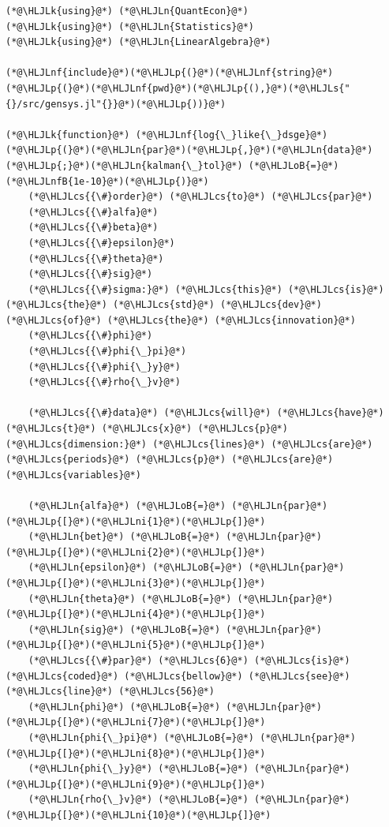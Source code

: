 \documentclass[12pt,a4paper]{article}
\newcommand{\HLJLk}[1]{\textcolor[RGB]{148,91,176}{\textbf{#1}}}
\newcommand{\HLJLn}[1]{#1}
\newcommand{\HLJLnf}[1]{\textcolor[RGB]{66,102,213}{#1}}
\newcommand{\HLJLs}[1]{\textcolor[RGB]{201,61,57}{#1}}
\newcommand{\HLJLnfB}[1]{\textcolor[RGB]{59,151,46}{#1}}
\newcommand{\HLJLni}[1]{\textcolor[RGB]{59,151,46}{#1}}
\newcommand{\HLJLoB}[1]{\textcolor[RGB]{102,102,102}{\textbf{#1}}}
\newcommand{\HLJLp}[1]{#1}
\newcommand{\HLJLcs}[1]{\textcolor[RGB]{153,153,119}{\textit{#1}}}
\begin{document}
\begin{lstlisting}
(*@\HLJLk{using}@*) (*@\HLJLn{QuantEcon}@*)
(*@\HLJLk{using}@*) (*@\HLJLn{Statistics}@*)
(*@\HLJLk{using}@*) (*@\HLJLn{LinearAlgebra}@*)

(*@\HLJLnf{include}@*)(*@\HLJLp{(}@*)(*@\HLJLnf{string}@*)(*@\HLJLp{(}@*)(*@\HLJLnf{pwd}@*)(*@\HLJLp{(),}@*)(*@\HLJLs{"{}/src/gensys.jl"{}}@*)(*@\HLJLp{))}@*)

(*@\HLJLk{function}@*) (*@\HLJLnf{log{\_}like{\_}dsge}@*)(*@\HLJLp{(}@*)(*@\HLJLn{par}@*)(*@\HLJLp{,}@*)(*@\HLJLn{data}@*)(*@\HLJLp{;}@*)(*@\HLJLn{kalman{\_}tol}@*) (*@\HLJLoB{=}@*) (*@\HLJLnfB{1e-10}@*)(*@\HLJLp{)}@*)
    (*@\HLJLcs{{\#}order}@*) (*@\HLJLcs{to}@*) (*@\HLJLcs{par}@*)
    (*@\HLJLcs{{\#}alfa}@*)
    (*@\HLJLcs{{\#}beta}@*)
    (*@\HLJLcs{{\#}epsilon}@*)
    (*@\HLJLcs{{\#}theta}@*)
    (*@\HLJLcs{{\#}sig}@*)
    (*@\HLJLcs{{\#}sigma:}@*) (*@\HLJLcs{this}@*) (*@\HLJLcs{is}@*) (*@\HLJLcs{the}@*) (*@\HLJLcs{std}@*) (*@\HLJLcs{dev}@*) (*@\HLJLcs{of}@*) (*@\HLJLcs{the}@*) (*@\HLJLcs{innovation}@*)
    (*@\HLJLcs{{\#}phi}@*)
    (*@\HLJLcs{{\#}phi{\_}pi}@*)
    (*@\HLJLcs{{\#}phi{\_}y}@*)
    (*@\HLJLcs{{\#}rho{\_}v}@*)

    (*@\HLJLcs{{\#}data}@*) (*@\HLJLcs{will}@*) (*@\HLJLcs{have}@*) (*@\HLJLcs{t}@*) (*@\HLJLcs{x}@*) (*@\HLJLcs{p}@*) (*@\HLJLcs{dimension:}@*) (*@\HLJLcs{lines}@*) (*@\HLJLcs{are}@*) (*@\HLJLcs{periods}@*) (*@\HLJLcs{p}@*) (*@\HLJLcs{are}@*) (*@\HLJLcs{variables}@*)

    (*@\HLJLn{alfa}@*) (*@\HLJLoB{=}@*) (*@\HLJLn{par}@*)(*@\HLJLp{[}@*)(*@\HLJLni{1}@*)(*@\HLJLp{]}@*)
    (*@\HLJLn{bet}@*) (*@\HLJLoB{=}@*) (*@\HLJLn{par}@*)(*@\HLJLp{[}@*)(*@\HLJLni{2}@*)(*@\HLJLp{]}@*)
    (*@\HLJLn{epsilon}@*) (*@\HLJLoB{=}@*) (*@\HLJLn{par}@*)(*@\HLJLp{[}@*)(*@\HLJLni{3}@*)(*@\HLJLp{]}@*)
    (*@\HLJLn{theta}@*) (*@\HLJLoB{=}@*) (*@\HLJLn{par}@*)(*@\HLJLp{[}@*)(*@\HLJLni{4}@*)(*@\HLJLp{]}@*)
    (*@\HLJLn{sig}@*) (*@\HLJLoB{=}@*) (*@\HLJLn{par}@*)(*@\HLJLp{[}@*)(*@\HLJLni{5}@*)(*@\HLJLp{]}@*)
    (*@\HLJLcs{{\#}par}@*) (*@\HLJLcs{6}@*) (*@\HLJLcs{is}@*) (*@\HLJLcs{coded}@*) (*@\HLJLcs{bellow}@*) (*@\HLJLcs{see}@*) (*@\HLJLcs{line}@*) (*@\HLJLcs{56}@*)
    (*@\HLJLn{phi}@*) (*@\HLJLoB{=}@*) (*@\HLJLn{par}@*)(*@\HLJLp{[}@*)(*@\HLJLni{7}@*)(*@\HLJLp{]}@*)
    (*@\HLJLn{phi{\_}pi}@*) (*@\HLJLoB{=}@*) (*@\HLJLn{par}@*)(*@\HLJLp{[}@*)(*@\HLJLni{8}@*)(*@\HLJLp{]}@*)
    (*@\HLJLn{phi{\_}y}@*) (*@\HLJLoB{=}@*) (*@\HLJLn{par}@*)(*@\HLJLp{[}@*)(*@\HLJLni{9}@*)(*@\HLJLp{]}@*)
    (*@\HLJLn{rho{\_}v}@*) (*@\HLJLoB{=}@*) (*@\HLJLn{par}@*)(*@\HLJLp{[}@*)(*@\HLJLni{10}@*)(*@\HLJLp{]}@*)


\end{lstlisting}
\end{document}
